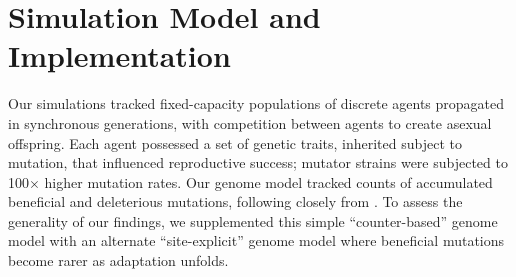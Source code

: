\section{Simulation Model and Implementation} \label{sec:methods}

Our simulations tracked fixed-capacity populations of discrete agents propagated in synchronous generations, with competition between agents to create asexual offspring.
Each agent possessed a set of genetic traits, inherited subject to mutation, that influenced reproductive success; mutator strains were subjected to 100$\times$ higher mutation rates.
Our genome model tracked counts of accumulated beneficial and deleterious mutations, following closely from \cite{raynes2018sign}.
To assess the generality of our findings, we supplemented this simple ``counter-based'' genome model with an alternate ``site-explicit'' genome model where beneficial mutations become rarer as adaptation unfolds.
%
%
%
